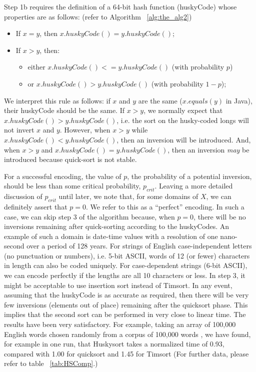 \documentclass[acmtog]{acmart}
\begin{document}
Step 1b requires the definition of a 64-bit hash function (huskyCode) whose properties are as follows: (refer to Algorithm ~\ref{alg:the_alg2})
\begin{itemize}
                        \item {}If $x = y$, then $x.huskyCode() = y.huskyCode()$;
                        \item {}If $x > y$, then: 
                            \begin{itemize}
                            \item{} either $x.huskyCode() <= y.huskyCode()$ (with probability $p$)
                            \item{} or $x.huskyCode() > y.huskyCode()$ (with probability $1-p$);
                            
                            \end{itemize}
                        
                        \end{itemize}


We interpret this rule as follows: if $x$ and $y$ are the same ($x.equals(y)$ in Java), their huskyCode should be the same.
If $x > y$, we normally expect that $x.huskyCode() > y.huskyCode()$, i.e. the sort on the husky-coded longs will not invert $x$ and $y$.
However, when $x > y$ while $x.huskyCode() < y.huskyCode()$, then an inversion will be introduced.
And, when $x > y$ and $x.huskyCode() = y.huskyCode()$, then an inversion \emph{may} be introduced because quick-sort is not stable.\cite{6115063}

For a successful encoding, the value of $p$, the probability of a potential inversion, should be less than some critical probability, $p_{crit}$.
Leaving a more detailed discussion of $p_{crit}$ until later, we note that, for some domains of $X$, we can definitely assert that $p = 0$.
We refer to this as a “perfect” encoding.
In such a case, we can skip step 3 of the algorithm because, when $p = 0$, there will be no inversions remaining after quick-sorting according to the huskyCodes.
An example of such a domain is date-time values with a resolution of one nano-second over a period of 128 years.
For strings of English case-independent letters (no punctuation or numbers), i.e. 5-bit ASCII, words of 12 (or fewer) characters in length can also be coded uniquely.
For case-dependent strings (6-bit ASCII), we can encode perfectly if the lengths are all 10 characters or less.
In step 3, it might be acceptable to use insertion sort instead of Timsort.
In any event, assuming that the huskyCode is as accurate as required, then there will be very few inversions (elements out of place) remaining after the quicksort phase.
This implies that the second sort can be performed in very close to linear time.
The results have been very satisfactory.
For example, taking an array of 100,000 English words chosen randomly from a corpus of 100,000 words \cite{GOLDHAHN12.327}, we have found, for example in one run, that Huskysort takes a normalized time of 0.93, compared with 1.00 for quicksort and 1.45 for Timsort (For further data, please refer to table ~\ref{tab:HSComp}.)
\end{document}
